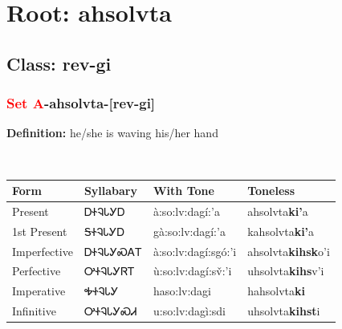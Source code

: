 \needspace{4in}
\section*{Root: ahsolvta}
\nopagebreak
{}
\needspace{3in}
\subsection*{Class: rev-gi}
\nopagebreak
\needspace{2in}
\subsubsection*{\textcolor{Red}{Set A}{-}\textbf{ahsolvta}{-}[rev-gi]}
\nopagebreak
\textbf{Definition: } he/she is waving his/her hand
\\[0.5em]
\begin{tabularx}{\textwidth}{l X X X}%
\toprule%
\textbf{Form}&\textbf{Syllabary}&\textbf{With Tone}&\textbf{Toneless}\\%
\midrule%
Present&ᎠᏐᎸᏓᎩᎠ&à:so:lv:dagí:’a&ahsolvta\textbf{ki'}a\\%
1st Present&ᎦᏐᎸᏓᎩᎠ&gà:so:lv:dagí:’a&kahsolvta\textbf{ki'}a\\%
Imperfective&ᎠᏐᎸᏓᎩᏍᎪᎢ&à:so:lv:dagí:sgó:’i&ahsolvta\textbf{kihsk}o'i\\%
Perfective&ᎤᏐᎸᏓᎩᏒᎢ&ù:so:lv:dagí:sv̌:’i&uhsolvta\textbf{kihs}v'i\\%
Imperative&ᎭᏐᎸᏓᎩ&haso:lv:dagi&hahsolvta\textbf{ki}\\%
Infinitive&ᎤᏐᎸᏓᎩᏍᏗ&u:so:lv:dagì:sdi&uhsolvta\textbf{kihst}i\\%
\bottomrule%
\end{tabularx}
\\[1em]